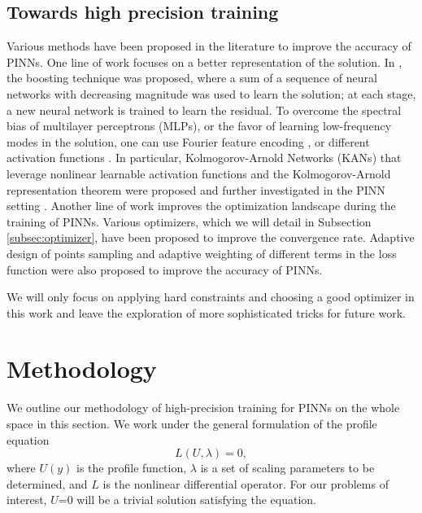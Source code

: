 \documentclass[12pt]{caltech_thesis}
\numberwithin{equation}{section}
\begin{document}
\subsection{Towards high precision training}
Various methods have been proposed in the literature to improve the accuracy of PINNs. One line of work focuses on a 
better representation of the solution. In \cite{michaud2023the, wang2024multi}, the boosting technique was proposed, where a sum of a sequence of neural networks
with decreasing magnitude was used to learn the solution; at each stage, a new neural network is trained to learn the residual.
To overcome the spectral bias \cite{rahaman2019spectral} of multilayer perceptrons (MLPs), or the favor of learning low-frequency modes \cite{xu2019training,xu2019frequency} in the solution, 
one can use Fourier feature encoding \cite{sitzmann2020implicit, tancik2020fourier,ng2024spectrum}, or different activation functions \cite{jagtap2020adaptive, jagtap2020locally,hong2022activation, zhang2023shallow,kanbias}. In particular, Kolmogorov-Arnold Networks (KANs) \cite{liu2024kan,kan1} that leverage nonlinear learnable activation functions and the Kolmogorov-Arnold representation theorem were proposed and further investigated in the PINN setting \cite{wang2024kolmogorov,shukla2024comprehensive,toscano2025pinns}.
Another line of work improves the optimization landscape during the training of PINNs.
Various optimizers, which we will detail in Subsection \ref{subsec:optimizer}, have been proposed to improve the convergence rate.
Adaptive design of points sampling \cite{anagnostopoulos2024residual,wu2023comprehensive,rigas2024adaptive} and adaptive weighting of different terms \cite{wang2021understanding,xiang2022self,mcclenny2023self} in the loss function
were also proposed to improve the accuracy of PINNs.

We will only focus on applying hard constraints and choosing a good optimizer in this work and leave 
the exploration of more sophisticated tricks for future work.
\section{Methodology} 
We outline our methodology of high-precision training for PINNs on the whole space in this section.
We work under the general formulation of the profile equation $$L(U,\lambda)=0,$$ where 
$U(y)$ is the profile function, $\lambda$ is a set of scaling parameters to be determined,
and $L$ is the nonlinear differential operator. For our problems of interest, $U$=0 will be a trivial 
solution satisfying the equation.
\end{document}
